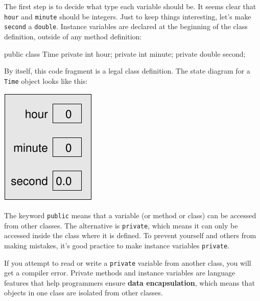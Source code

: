 \documentclass[12pt]{book}
\makeatletter
\theoremstyle{exercise}
\newcommand{\java}[1]{\verb"#1"}
\renewcommand\subsection{\@startsection{subsection}{2}{\z@}%
    {-3.25ex\@plus -1ex \@minus -.2ex}%
    {0.3ex \@plus .2ex}%
    {\normalfont\large\bfseries}}
\newcommand{\java}[1]{\lstinline{#1}} %
\makeatother
\begin{document}
The first step is to decide what type each variable should be.
It seems clear that \java{hour} and \java{minute} should be integers.
Just to keep things interesting, let's make \java{second} a \java{double}.
Instance variables are declared at the beginning of the class definition, outside of any method definition:

\begin{code}
public class Time {
    private int hour;
    private int minute;
    private double second;
}
\end{code}

By itself, this code fragment is a legal class definition.
The state diagram for a \java{Time} object looks like this:

\begin{center}
\includegraphics{figs/time.pdf}
\end{center}


The keyword \java{public} means that a variable (or method or class) can be accessed from other classes.
The alternative is \java{private}, which means it can only be accessed inside the class where it is defined.
To prevent yourself and others from making mistakes, it's good practice to make instance variables \java{private}.


If you attempt to read or write a \java{private} variable from another class, you will get a compiler error.
Private methods and instance variables are language features that help programmers ensure {\bf data encapsulation}, which means that objects in one class are isolated from other classes.

\end{document}
